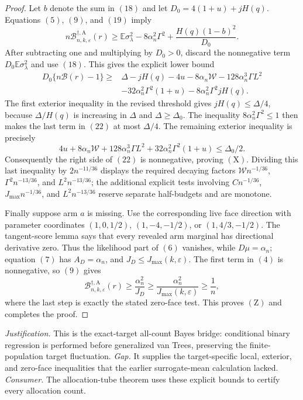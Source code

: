 \documentclass{article}
\begin{document}
{\begin{proof}
Let \(b\) denote the sum in \((18)\) and let
\(D_0=4(1+u)+jH(q)\).  Equations \((5)\), \((9)\), and \((19)\) imply
\[
n\mathcal B_{n,k,\varepsilon}^{\dagger,\mathrm A}(r)
\ge \mathbb E\sigma_\lambda^2
-8\alpha_n^2\Gamma^2+\frac{H(q)(1-b)^2}{D_0}.
\tag{21}
\]
After subtracting one and multiplying by \(D_0>0\), discard the nonnegative term
\(D_0\mathbb E\sigma_\lambda^2\) and use \((18)\).  This gives the explicit lower bound
\[
\begin{aligned}
D_0\{n\mathcal B(r)-1\}
\ge{}&\Delta-jH(q)-4u-8\alpha_n\mathcal W
-128\alpha_n^3\Gamma L^2\\
&-32\alpha_n^2\Gamma^2(1+u)
-8\alpha_n^2\Gamma^2jH(q).
\end{aligned}
\tag{22}
\]
The first exterior inequality in the revised threshold gives
\(jH(q)\le\Delta/4\), because \(\Delta/H(q)\) is increasing in \(\Delta\) and \(\Delta\ge\Delta_0\).  The inequality
\(8\alpha_n^2\Gamma^2\le1\) then makes the last term in \((22)\) at most \(\Delta/4\).  The remaining exterior inequality is precisely
\[
4u+8\alpha_n\mathcal W+128\alpha_n^3\Gamma L^2
+32\alpha_n^2\Gamma^2(1+u)\le\Delta_0/2.
\]
Consequently the right side of \((22)\) is nonnegative, proving \((\mathrm X)\).  Dividing this last inequality by
\(2n^{-11/36}\) displays the required decaying factors
\(\mathcal Wn^{-1/36}\), \(\Gamma^2n^{-13/36}\), and
\(L^2n^{-13/36}\); the additional explicit tests involving
\(C n^{-1/36}\), \(J_{\max}n^{-1/36}\), and
\(L^2n^{-13/36}\) reserve separate half-budgets and are monotone.

Finally suppose arm \(a\) is missing.  Use the corresponding live face direction with parameter coordinates
\((1,0,1/2)\), \((1,-4,-1/2)\), or \((1,4/3,-1/2)\).
The tangent-score lemma says that every revealed arm marginal has directional derivative zero.  Thus the likelihood part of \((6)\) vanishes, while \(D\mu=\alpha_n\); equation \((7)\) has \(A_D=\alpha_n\), and \(J_D\le J_{\max}(k,\varepsilon)\).  The first term in \((4)\) is nonnegative, so \((9)\) gives
\[
\mathcal B_{n,k,\varepsilon}^{\dagger,\mathrm A}(r)
\ge\frac{\alpha_n^2}{J_D}
\ge\frac{\alpha_n^2}{J_{\max}(k,\varepsilon)}\ge\frac1n,
\]
where the last step is exactly the stated zero-face test.  This proves \((\mathrm Z)\) and completes the proof.
\end{proof}
\par\smallskip\noindent \textit{Justification.} This is the exact-target all-count Bayes bridge: conditional binary regression is performed before generalized van Trees, preserving the finite-population target fluctuation. \textit{Gap.} It supplies the target-specific local, exterior, and zero-face inequalities that the earlier surrogate-mean calculation lacked. \textit{Consumer.} The allocation-tube theorem uses these explicit bounds to certify every allocation count.

}
\end{document}
